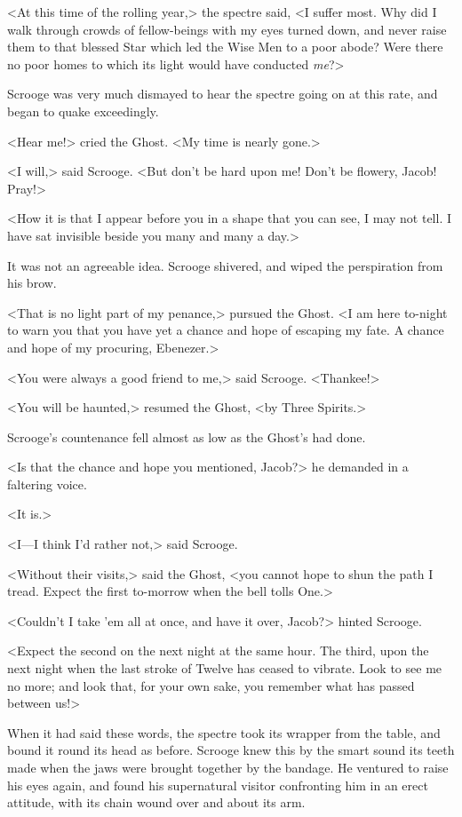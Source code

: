 <At this time of the rolling year,> the spectre said, <I suffer most. Why did I
walk through crowds of fellow-beings with my eyes turned down, and never raise
them to that blessed Star which led the Wise Men to a poor abode? Were there no
poor homes to which its light would have conducted \emph{me}?>

Scrooge was very much dismayed to hear the spectre going on at this rate, and
began to quake exceedingly.

<Hear me!> cried the Ghost. <My time is nearly gone.>

<I will,> said Scrooge. <But don't be hard upon me! Don't be flowery, Jacob!
Pray!>

<How it is that I appear before you in a shape that you can see, I may not tell.
I have sat invisible beside you many and many a day.>

It was not an agreeable idea. Scrooge shivered, and wiped the perspiration from
his brow.

<That is no light part of my penance,> pursued the Ghost. <I am here to-night to
warn you that you have yet a chance and hope of escaping my fate. A chance and
hope of my procuring, Ebenezer.>

<You were always a good friend to me,> said Scrooge. <Thankee!>

<You will be haunted,> resumed the Ghost, <by Three Spirits.>

Scrooge's countenance fell almost as low as the Ghost's had done.

<Is that the chance and hope you mentioned, Jacob?> he demanded in a faltering
voice.

<It is.>

<I—I think I'd rather not,> said Scrooge.

<Without their visits,> said the Ghost, <you cannot hope to shun the path I
tread. Expect the first to-morrow when the bell tolls One.>

<Couldn't I take 'em all at once, and have it over, Jacob?> hinted Scrooge.

<Expect the second on the next night at the same hour. The third, upon the next
night when the last stroke of Twelve has ceased to vibrate. Look to see me no
more; and look that, for your own sake, you remember what has passed between
us!>

When it had said these words, the spectre took its wrapper from the table, and
bound it round its head as before. Scrooge knew this by the smart sound its
teeth made when the jaws were brought together by the bandage. He ventured to
raise his eyes again, and found his supernatural visitor confronting him in an
erect attitude, with its chain wound over and about its arm.

